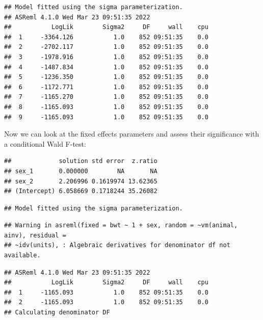 \documentclass[
  12pt,
]{book}
\newenvironment{Shaded}{\begin{snugshade}}{\end{snugshade}}
\newcommand{\DataTypeTok}[1]{\textcolor[rgb]{0.13,0.29,0.53}{#1}}
\newcommand{\KeywordTok}[1]{\textcolor[rgb]{0.13,0.29,0.53}{\textbf{#1}}}
\newcommand{\NormalTok}[1]{#1}
\newcommand{\OperatorTok}[1]{\textcolor[rgb]{0.81,0.36,0.00}{\textbf{#1}}}
\newcommand{\OtherTok}[1]{\textcolor[rgb]{0.56,0.35,0.01}{#1}}
\newcommand{\StringTok}[1]{\textcolor[rgb]{0.31,0.60,0.02}{#1}}
\begin{document}
\begin{verbatim}
## Model fitted using the sigma parameterization.
## ASReml 4.1.0 Wed Mar 23 09:51:35 2022
##           LogLik        Sigma2     DF     wall    cpu
##  1     -3364.126           1.0    852 09:51:35    0.0
##  2     -2702.117           1.0    852 09:51:35    0.0
##  3     -1978.916           1.0    852 09:51:35    0.0
##  4     -1487.834           1.0    852 09:51:35    0.0
##  5     -1236.350           1.0    852 09:51:35    0.0
##  6     -1172.771           1.0    852 09:51:35    0.0
##  7     -1165.270           1.0    852 09:51:35    0.0
##  8     -1165.093           1.0    852 09:51:35    0.0
##  9     -1165.093           1.0    852 09:51:35    0.0
\end{verbatim}

Now we can look at the fixed effects parameters and assess their significance with a conditional Wald F-test:

\begin{Shaded}
\end{Shaded}

\begin{verbatim}
##             solution std error  z.ratio
## sex_1       0.000000        NA       NA
## sex_2       2.206996 0.1619974 13.62365
## (Intercept) 6.058669 0.1718244 35.26082
\end{verbatim}

\begin{verbatim}
## Model fitted using the sigma parameterization.
\end{verbatim}

\begin{verbatim}
## Warning in asreml(fixed = bwt ~ 1 + sex, random = ~vm(animal, ainv), residual =
## ~idv(units), : Algebraic derivatives for denominator df not available.
\end{verbatim}

\begin{verbatim}
## ASReml 4.1.0 Wed Mar 23 09:51:35 2022
##           LogLik        Sigma2     DF     wall    cpu
##  1     -1165.093           1.0    852 09:51:35    0.0
##  2     -1165.093           1.0    852 09:51:35    0.0
## Calculating denominator DF
\end{verbatim}
\end{document}

